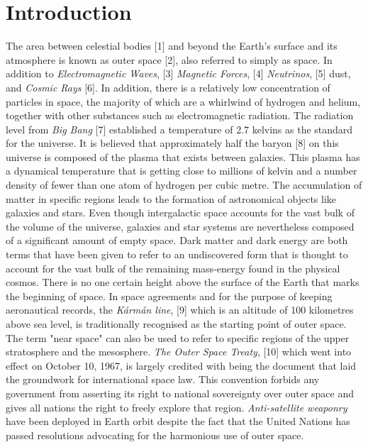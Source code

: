 \documentclass[conference]{IEEEtran}
\begin{document}
\section{Introduction}
The area between celestial bodies [1] and beyond the Earth's surface and its atmosphere is known as outer space [2], also referred to simply as space. In addition to \textit{Electromagnetic Waves}, [3] \textit{Magnetic Forces}, [4] \textit{Neutrinos}, [5] dust, and \textit{Cosmic Rays} [6]. In addition, there is a relatively low concentration of particles in space, the majority of which are a whirlwind of hydrogen and helium, together with other substances such as electromagnetic radiation. The radiation level from \textit{Big Bang} [7] established a temperature of 2.7 kelvins as the standard for the universe. It is believed that approximately half the baryon [8] on this universe is composed of the plasma that exists between galaxies. This plasma has a dynamical temperature that is getting close to millions of kelvin and a number density of fewer than one atom of hydrogen per cubic metre. The accumulation of matter in specific regions leads to the formation of astronomical objects like galaxies and stars. Even though intergalactic space accounts for the vast bulk of the volume of the universe, galaxies and star systems are nevertheless composed of a significant amount of empty space. Dark matter and dark energy are both terms that have been given to refer to an undiscovered form that is thought to account for the vast bulk of the remaining mass-energy found in the physical cosmos. There is no one certain height above the surface of the Earth that marks the beginning of space. In space agreements and for the purpose of keeping aeronautical records, the \textit{Kármán line}, [9] which is an altitude of 100 kilometres above sea level, is traditionally recognised as the starting point of outer space. The term "near space" can also be used to refer to specific regions of the upper stratosphere and the mesosphere. \textit{The Outer Space Treaty}, [10] which went into effect on October 10, 1967, is largely credited with being the document that laid the groundwork for international space law. This convention forbids any government from asserting its right to national sovereignty over outer space and gives all nations the right to freely explore that region. \textit{Anti-satellite weaponry} have been deployed in Earth orbit despite the fact that the United Nations has passed resolutions advocating for the harmonious use of outer space. \\
\end{document}
